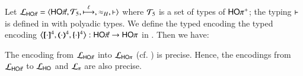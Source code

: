 Let $\tyl{L}_{\PHOp}=\calc{\PHOp}{{\cal{T}}_5}{\hby{\ell}}{\wb_H}{\proves}$
where 
${\cal{T}}_5$ is a set of types of $\mathsf{HO\pi^{+}}$;  
the typing $\vdash$ is defined in 
 with polyadic types. 
We define the typed encoding 
the typed encoding $\enco{\map{\cdot}^{4}, \mapt{\cdot}^{4}, \mapa{\cdot}^{4}}: \PHOp \to \HOp$ 
in . 
Then we have:

\smallskip 

\begin{theorem}
\label{f:enc:phopiptohopi}
The encoding from $\mathcal{L}_{\mathsf{HO}{\vec{\pi}}}$ into $\mathcal{L}_{\mathsf{HO}\pi}$ (cf. )
is precise. 
Hence, the encodings 
from $\mathcal{L}_{\mathsf{HO}{\vec{\pi}}}$ to 
$\mathcal{L}_{\mathsf{HO}}$ 
and $\mathcal{L}_{\pi}$ 
are also precise. 
\end{theorem}

